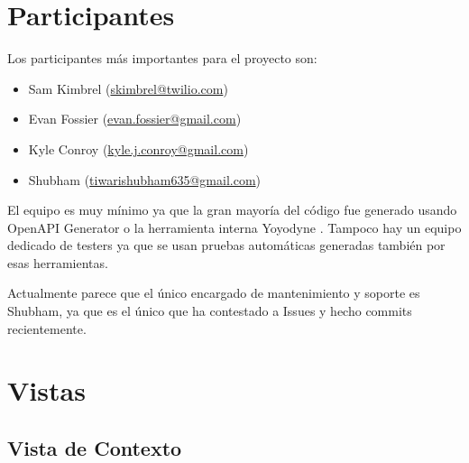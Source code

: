 \documentclass{article}
\begin{document}
\section{Participantes}

Los participantes más importantes para el proyecto son:
\begin{itemize}
  \setlength\itemsep{0em}
  \item Sam Kimbrel 
  (\href{mailto:skimbrel@twilio.com}{skimbrel@twilio.com})
  \item Evan Fossier
  (\href{mailto:evan.fossier@gmail.com}{evan.fossier@gmail.com})
  \item Kyle Conroy
  (\href{mailto:kyle.j.conroy@gmail.com}{kyle.j.conroy@gmail.com})
  \item Shubham
  (\href{mailto:tiwarishubham635@gmail.com}{tiwarishubham635@gmail.com})
\end{itemize}
  
El equipo es muy mínimo ya que la gran mayoría del código
fue generado usando OpenAPI Generator
\cite{twilio-generated-openapi}
o la herramienta interna Yoyodyne
\cite{twilio-generated-yoyodyne}.
Tampoco hay un equipo dedicado de testers
ya que se usan pruebas automáticas generadas también por esas herramientas.

Actualmente parece
que el único encargado de mantenimiento y soporte es Shubham,
ya que es el único que ha contestado a Issues y hecho commits recientemente.

\section{Vistas}

\subsection{Vista de Contexto}

\hfill
\end{document}
